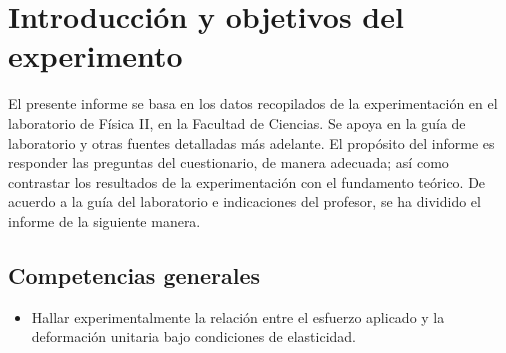 \section{Introducción y objetivos del experimento}

El presente informe se basa en los datos recopilados de la experimentación en el laboratorio de Física II, en la Facultad de Ciencias. Se apoya en la guía de laboratorio y otras fuentes detalladas más adelante. El propósito del informe es responder las preguntas del cuestionario, de manera adecuada; así como contrastar los resultados de la experimentación con el fundamento teórico. De acuerdo a la guía del laboratorio e indicaciones del profesor, se ha dividido el informe de la siguiente manera.

\subsection{Competencias generales}
\begin{itemize}
  \item Hallar experimentalmente la relación entre el esfuerzo aplicado y la deformación unitaria bajo condiciones de elasticidad.
\end{itemize}
